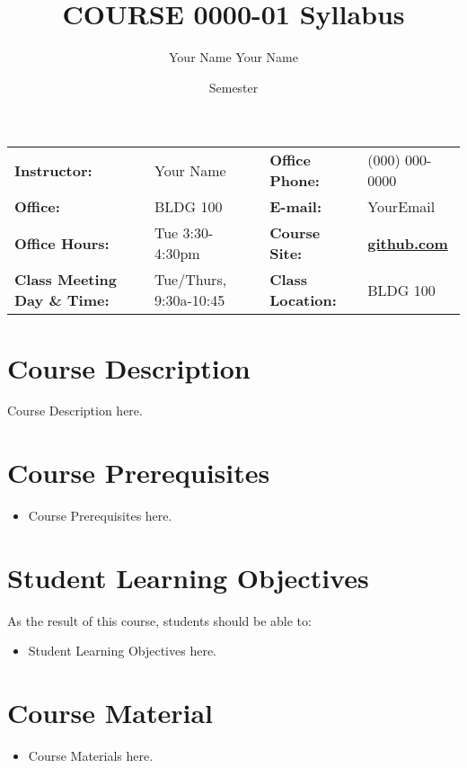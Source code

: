 \documentclass[article,letterpaper,times,10pt,listings-bw,microtype]{scrartcl}
\author{Your Name Your Name}
\date{Semester}
\title{COURSE 0000-01 Syllabus}
\begin{document}

\begin{center}
{}
\end{center}

\begin{center}
{}
\end{center}

\vspace{5 mm}

\begin{center}
\begin{tabular}{llll}
\textbf{Instructor:} & Your Name & \textbf{Office Phone:} & (000) 000-0000\\
\textbf{Office:} & BLDG 100 & \textbf{E-mail:} & YourEmail\\
\textbf{Office Hours:} & Tue 3:30-4:30pm & \textbf{Course Site:} & \textbf{\href{https://github.com}{github.com}}\\
\textbf{Class Meeting Day \& Time:} & Tue/Thurs, 9:30a-10:45 & \textbf{Class Location:} & BLDG 100\\
\end{tabular}
\end{center}
\section*{Course Description}
\label{sec:orgbb3d188}
Course Description here.
\section*{Course Prerequisites}
\label{sec:org5b6607e}
\begin{itemize}
\item Course Prerequisites here.
\end{itemize}
\section*{Student Learning Objectives}
\label{sec:org601321f}
As the result of this course, students should be able to:

\begin{itemize}
\item Student Learning Objectives here.
\end{itemize}
\section*{Course Material}
\label{sec:org21f90ab}
\begin{itemize}
\item Course Materials here.
\end{itemize}
\end{document}
